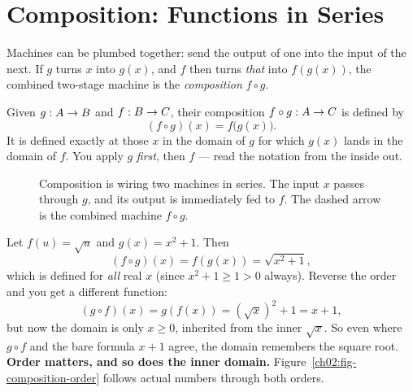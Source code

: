 \section{Composition: Functions in Series}
\label{ch02:composition}
Machines can be plumbed together: send the output of one into the input of the
next. If $g$ turns $x$ into $g(x)$, and $f$ then turns \emph{that} into
$f(g(x))$, the combined two-stage machine is the \emph{composition} $f \circ g$.
\begin{definition}[Composition]
\label{ch02:def-composition}
Given $g : A \to B$ and $f : B \to C$, their composition $f \circ g : A \to C$ is
defined by
\[
  (f \circ g)(x) = f\bigl(g(x)\bigr).
\]
It is defined exactly at those $x$ in the domain of $g$ for which $g(x)$ lands in
the domain of $f$. You apply $g$ \emph{first}, then $f$ --- read the notation from
the inside out.
\end{definition}
\begin{figure}[htbp]
\centering
{}
\caption{Composition is wiring two machines in series. The input $x$ passes through
$g$, and its output is immediately fed to $f$. The dashed arrow is the combined
machine $f \circ g$.}
\label{ch02:fig-composition}
\end{figure}
\begin{example}
\label{ch02:ex-composition}
Let $f(u) = \sqrt{u}$ and $g(x) = x^2 + 1$. Then
\[
  (f \circ g)(x) = f(g(x)) = \sqrt{x^2 + 1},
\]
which is defined for \emph{all} real $x$ (since $x^2+1 \ge 1 > 0$ always). Reverse
the order and you get a different function:
\[
  (g \circ f)(x) = g(f(x)) = (\sqrt{x})^2 + 1 = x + 1,
\]
but now the domain is only $x \ge 0$, inherited from the inner $\sqrt{x}$. So even
where $g\circ f$ and the bare formula $x+1$ agree, the domain remembers the square
root. \textbf{Order matters, and so does the inner domain.}
Figure~\ref{ch02:fig-composition-order} follows actual numbers through both orders.
\end{example}

